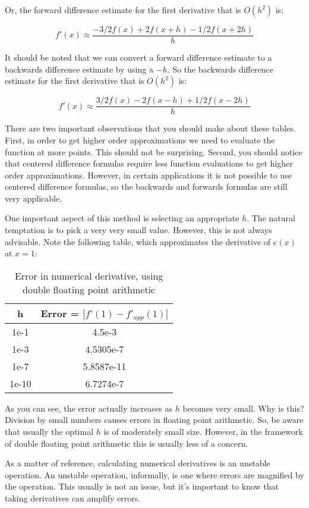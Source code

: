 Or, the forward difference estimate for the first derivative that is $O(h^2)$ is:

\[
f'(x) \approx \frac{-3/2f(x) + 2f(x+h) - 1/2 f(x+2h)}{h}
\]

It should be noted that we can convert a forward difference estimate to a backwards difference estimate by using a $-h$. So the backwards difference estimate for the first derivative that is $O(h^2)$ is:

\[
f'(x) \approx \frac{3/2f(x) - 2f(x-h) + 1/2 f(x-2h)}{h}
\]

There are two important observations that you should make about these tables. First, in order to get higher order approximations we need to evaluate the function at more points. This should not be surprising. Second, you should notice that centered difference formulas require less function evaluations to get higher order approximations. However, in certain applications it is not possible to use centered difference formulas, so the backwards and forwards formulas are still very applicable.

One important aspect of this method is selecting an appropriate $h$. The natural temptation is to pick a very very small value. However, this is not always advisable. Note the following table, which approximates the derivative of $e(x)$ at $x = 1$:

\begin{table}[h!]
\begin{center}
\begin{tabular}{|cc|}
\hline
h & Error  = $|f'(1)-f'_{app}(1)|$ \\ \hline
1e-1 & 4.5e-3 \\
1e-3 & 4.5305e-7 \\
1e-7 & 5.8587e-11 \\
1e-10 & 6.7274e-7 \\ \hline
\end{tabular}
\caption{Error in numerical derivative, using double floating point arithmetic}
\end{center}
\end{table}

As you can see, the error actually increases as $h$ becomes very small. Why is this? Division by small numbers causes errors in floating point arithmetic. So, be aware that usually the optimal $h$ is of moderately small size. However, in the framework of double floating point arithmetic this is usually less of a concern.

As a matter of reference, calculating numerical derivatives is an unstable operation. An unstable operation, informally, is one where errors are magnified by the operation. This usually is not an issue, but it's important to know that taking derivatives can amplify errors.

